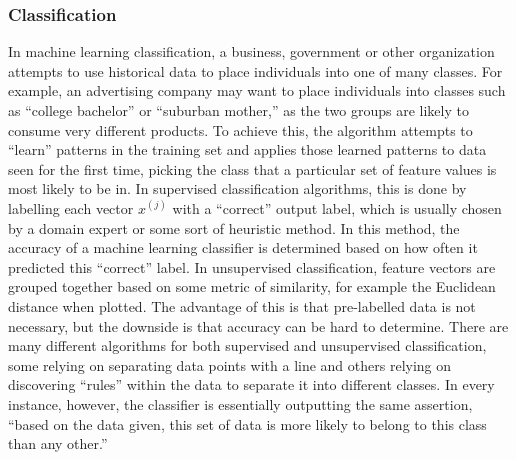 \documentclass[12pt]{article} %
\begin{document}
\subsubsection{Classification}
In machine learning classification, a business, government or other organization attempts to use historical data to place individuals into one of many classes. For example, an advertising company may want to place individuals into classes such as ``college bachelor'' or ``suburban mother,'' as the two groups are likely to consume very different products. To achieve this, the algorithm attempts to ``learn'' patterns in the training set and applies those learned patterns to data seen for the first time, picking the class that a particular set of feature values is most likely to be in. In supervised classification algorithms, this is done by labelling each vector $x^{(j)}$ with a ``correct'' output label, which is usually chosen by a domain expert or some sort of heuristic method. In this method, the accuracy of a machine learning classifier is determined based on how often it predicted this ``correct'' label. In unsupervised classification, feature vectors are grouped together based on some metric of similarity, for example the Euclidean distance when plotted. The advantage of this is that pre-labelled data is not necessary, but the downside is that accuracy can be hard to determine. There are many different algorithms for both supervised and unsupervised classification, some relying on separating data points with a line and others relying on discovering ``rules'' within the data to separate it into different classes. In every instance, however, the classifier is essentially outputting the same assertion, ``based on the data given, this set of data is more likely to belong to this class than any other.''
\end{document}
